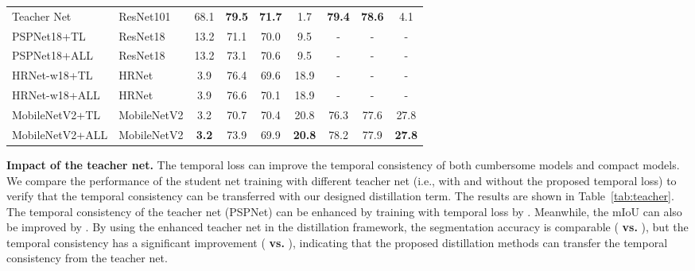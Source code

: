 \documentclass[runningheads]{llncs}
\begin{document}
\begin{table}[h]
\begin{tabular}{l|l|c|c|c|c|c|c|c}
Teacher Net & ResNet101               & 68.1                    & \textbf{79.5}     &\textbf{71.7}     &  1.7    & \textbf{79.4}       &\textbf{78.6}      & 4.1\\
  PSPNet18+TL                                  & ResNet18              & 13.2                    & 71.1     & 70.0     & 9.5   & -       & -      & -       \\
                   PSPNet18+ALL                                    &  ResNet18                    & 13.2                    & 73.1     & 70.6     & 9.5    & -       & -      & -       \\
                   HRNet-w18+TL                                   & HRNet                     & 3.9                     & 76.4     & 69.6     & 18.9     & -       & -      & -       \\
                   HRNet-w18+ALL                                   & HRNet                     & 3.9                     & 76.6     & 70.1     & 18.9     & -       & -      & -       \\
                   MobileNetV2+TL                                 & MobileNetV2           & 3.2                     & 70.7     & 70.4     & 20.8     & 76.3    & 77.6   & 27.8    \\
                   MobileNetV2+ALL                                 & MobileNetV2      & \textbf{3.2}                     & 73.9     & 69.9     & \textbf{20.8}     & 78.2    & 77.9   & \textbf{27.8 }   \\\bottomrule
\end{tabular}
\label{SOTA}
\end{table}


\noindent\textbf{Impact of the teacher net.}
The temporal loss can improve the temporal consistency of both cumbersome models and compact models. We compare the performance of the student net training with different teacher net (i.e., with and without the proposed temporal loss) to verify that the temporal consistency can be transferred with our designed distillation term. The results are shown in Table~\ref{tab:teacher}. The temporal consistency of the teacher net (PSPNet) can be enhanced by training with temporal loss by . Meanwhile, the mIoU can also be improved by .  By using the enhanced teacher net in the distillation framework, the segmentation accuracy is comparable ( \textbf{vs.} ), but the temporal consistency has a significant improvement ( \textbf{vs.} ), indicating that the proposed distillation methods can transfer the temporal consistency from the teacher net.
\end{document}
